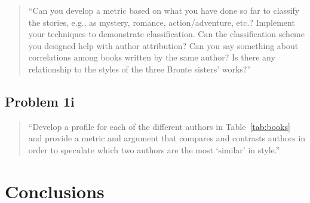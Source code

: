 \documentclass[conference]{IEEEtran}
\begin{document}
\begin{quote}
``Can you develop a metric based on what you have done so far to classify the stories, e.g., 
as mystery, romance, action/adventure, etc.? Implement your techniques to demonstrate 
classification. Can the classification scheme you designed help with author attribution? 
Can you say something about correlations among books written by the same author? 
Is there any relationship to the styles of the three Bronte sisters' works?''
\end{quote}

\subsection{Problem 1i}

\begin{quote}
``Develop a profile for each of the different authors in Table~\ref{tab:books} and provide 
a metric and argument that compares and contrasts authors in order to speculate which 
two authors are the most `similar' in style.''
\end{quote}


\section{Conclusions}


% 
% 


\begin{framed}
\fontsize{5.65}{6.78}\selectfont

\end{framed}
\end{document}
